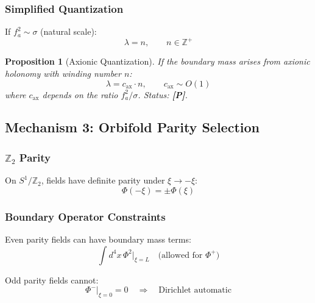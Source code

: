 \documentclass[11pt,a4paper]{article}
\newcommand{\tagP}{\textbf{[P]}}
\theoremstyle{definition}
\theoremstyle{plain}
\newtheorem{proposition}{Proposition}[section]
\theoremstyle{remark}
\begin{document}
\subsubsection{Simplified Quantization}

If $f_a^2 \sim \sigma$ (natural scale):
\begin{equation}
\lambda = n, \qquad n \in \mathbb{Z}^+
\label{eq:lambda-axion}
\end{equation}

\begin{proposition}[Axionic Quantization]
\label{prop:axion-quant}
If the boundary mass arises from axionic holonomy with winding number $n$:
\begin{equation}
\lambda = c_{\mathrm{ax}} \cdot n, \qquad c_{\mathrm{ax}} \sim O(1)
\label{eq:lambda-axion-result}
\end{equation}
where $c_{\mathrm{ax}}$ depends on the ratio $f_a^2/\sigma$. Status: \tagP{}.
\end{proposition}

\subsection{Mechanism 3: Orbifold Parity Selection}

\subsubsection{$\mathbb{Z}_2$ Parity}

On $S^1/\mathbb{Z}_2$, fields have definite parity under $\xi \to -\xi$:
\begin{equation}
\Phi(-\xi) = \pm \Phi(\xi)
\label{eq:parity}
\end{equation}

\subsubsection{Boundary Operator Constraints}

Even parity fields can have boundary mass terms:
\begin{equation}
\int d^4x \, \Phi^2\big|_{\xi=L} \quad \text{(allowed for } \Phi^+ \text{)}
\label{eq:even-op}
\end{equation}

Odd parity fields cannot:
\begin{equation}
\Phi^-|_{\xi=0} = 0 \quad \Rightarrow \quad \text{Dirichlet automatic}
\label{eq:odd-op}
\end{equation}
\end{document}
